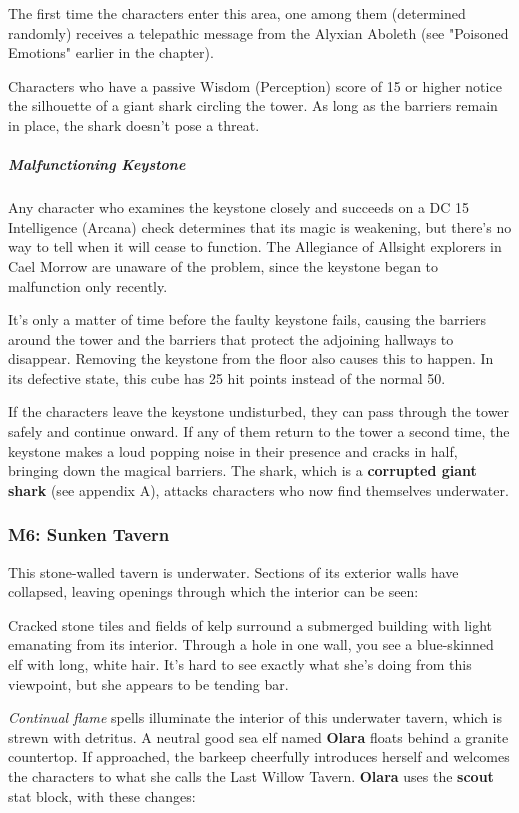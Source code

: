 \documentclass[10pt,a4paper,twoside,bg=print,twocolumn,openany,nodeprecatedcode]{dndbook}
\begin{document}
The first time the characters enter this area, one among them (determined randomly) receives a telepathic message from the Alyxian Aboleth (see "Poisoned Emotions" earlier in the chapter).

Characters who have a passive Wisdom (Perception) score of 15 or higher notice the silhouette of a giant shark circling the tower. As long as the barriers remain in place, the shark doesn't pose a threat.

\subparagraph{Malfunctioning Keystone}
Any character who examines the keystone closely and succeeds on a DC 15 Intelligence (Arcana) check determines that its magic is weakening, but there's no way to tell when it will cease to function. The Allegiance of Allsight explorers in Cael Morrow are unaware of the problem, since the keystone began to malfunction only recently.

It's only a matter of time before the faulty keystone fails, causing the barriers around the tower and the barriers that protect the adjoining hallways to disappear. Removing the keystone from the floor also causes this to happen. In its defective state, this cube has 25 hit points instead of the normal 50.

If the characters leave the keystone undisturbed, they can pass through the tower safely and continue onward. If any of them return to the tower a second time, the keystone makes a loud popping noise in their presence and cracks in half, bringing down the magical barriers. The shark, which is a \textbf{corrupted giant shark} (see appendix A), attacks characters who now find themselves underwater.

\subsubsection{M6: Sunken Tavern}
This stone-walled tavern is underwater. Sections of its exterior walls have collapsed, leaving openings through which the interior can be seen:

\begin{DndReadAloud}{}
Cracked stone tiles and fields of kelp surround a submerged building with light emanating from its interior. Through a hole in one wall, you see a blue-skinned elf with long, white hair. It's hard to see exactly what she's doing from this viewpoint, but she appears to be tending bar.

\end{DndReadAloud}

\textit{Continual flame} spells illuminate the interior of this underwater tavern, which is strewn with detritus. A neutral good sea elf named \textbf{Olara} floats behind a granite countertop. If approached, the barkeep cheerfully introduces herself and welcomes the characters to what she calls the Last Willow Tavern. \textbf{Olara} uses the \textbf{scout} stat block, with these changes:
\end{document}
